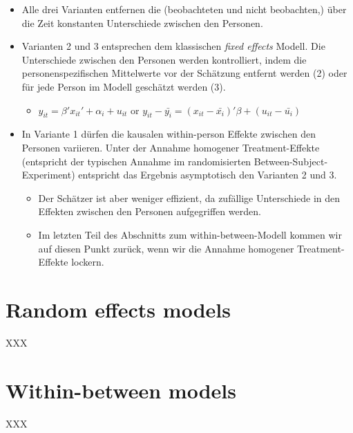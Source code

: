 \documentclass[]{book}
\providecommand{\tightlist}{%
  \setlength{\itemsep}{0pt}\setlength{\parskip}{0pt}}
\begin{document}
\begin{itemize}
\tightlist
\item
  Alle drei Varianten entfernen die (beobachteten und nicht beobachten,) über die Zeit konstanten Unterschiede zwischen den Personen.
\item
  Varianten 2 und 3 entsprechen dem klassischen \emph{fixed effects} Modell. Die Unterschiede zwischen den Personen werden kontrolliert, indem die personenspezifischen Mittelwerte vor der Schätzung entfernt werden (2) oder für jede Person im Modell geschätzt werden (3).

  \begin{itemize}
  \tightlist
  \item
    \(y_{it} = \beta' x_{it}' + \alpha_i + u_{it}\) or \(y_{it}-\bar{y_{i}} = (x_{it} - \bar{x_{i}})'\beta + (u_{it} - \bar{u_{i}})\)
  \end{itemize}
\item
  In Variante 1 dürfen die kausalen within-person Effekte zwischen den Personen variieren. Unter der Annahme homogener Treatment-Effekte (entspricht der typischen Annahme im randomisierten Between-Subject-Experiment) entspricht das Ergebnis asymptotisch den Varianten 2 und 3.

  \begin{itemize}
  \tightlist
  \item
    Der Schätzer ist aber weniger effizient, da zufällige Unterschiede in den Effekten zwischen den Personen aufgegriffen werden.
  \item
    Im letzten Teil des Abschnitts zum within-between-Modell kommen wir auf diesen Punkt zurück, wenn wir die Annahme homogener Treatment-Effekte lockern.
  \end{itemize}
\end{itemize}

\hypertarget{random-effects-models}{%
\chapter{Random effects models}\label{random-effects-models}}

XXX

\hypertarget{within-between-models}{%
\chapter{Within-between models}\label{within-between-models}}

XXX


\end{document}
